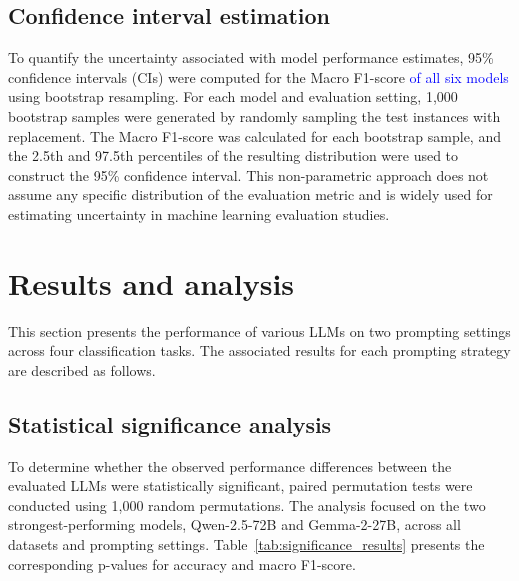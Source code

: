 \documentclass[10pt,letterpaper]{article}
\newcommand{\rev}[1]{\textcolor{blue}{#1}}
\begin{document}
\subsection*{Confidence interval estimation}
\label{sec:confidence_interval}

To quantify the uncertainty associated with model performance estimates, 95\% confidence intervals (CIs) were computed for the Macro F1-score \rev{of all six models} using bootstrap resampling. For each model and evaluation setting, 1,000 bootstrap samples were generated by randomly sampling the test instances with replacement. The Macro F1-score was calculated for each bootstrap sample, and the 2.5th and 97.5th percentiles of the resulting distribution were used to construct the 95\% confidence interval. This non-parametric approach does not assume any specific distribution of the evaluation metric and is widely used for estimating uncertainty in machine learning evaluation studies.



\section*{Results and analysis}
\label{sec:results}

This section presents the performance of various LLMs on two prompting settings across four classification tasks. The associated results for each prompting strategy are described as follows.

\subsection*{Statistical significance analysis}

To determine whether the observed performance differences between the evaluated LLMs were statistically significant, paired permutation tests were conducted using 1,000 random permutations. The analysis focused on the two strongest-performing models, Qwen-2.5-72B and Gemma-2-27B, across all datasets and prompting settings. Table~\ref{tab:significance_results} presents the corresponding p-values for accuracy and macro F1-score.
\end{document}
